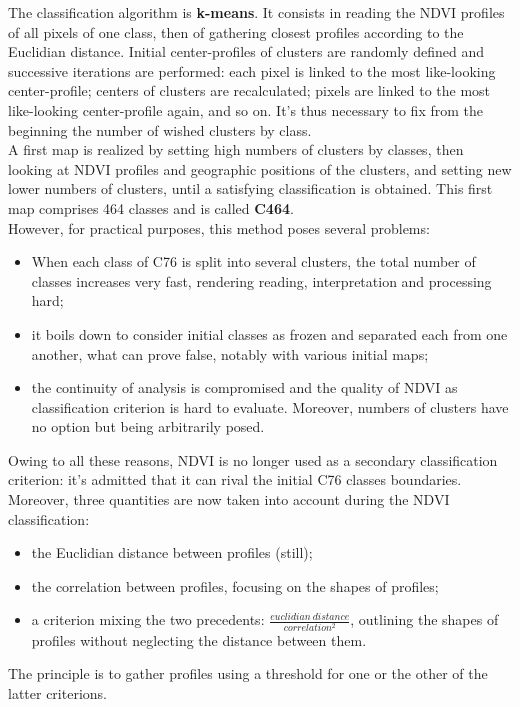 The classification algorithm is \textbf{k-means}. 
It consists in reading the NDVI profiles of all pixels of one class, then of gathering closest profiles 
according to the Euclidian distance. Initial center-profiles of clusters are randomly defined and successive iterations are 
performed: each pixel is linked to the most like-looking center-profile; centers of clusters are recalculated; pixels are linked to 
the most like-looking center-profile again, and so on. It's thus necessary to fix from the beginning the number of wished clusters by class.\\ 
A first map is realized by setting high numbers of clusters by classes, then looking at NDVI profiles and geographic positions of the clusters, and 
setting new lower numbers of clusters, until a satisfying classification is obtained. This first map comprises 464 classes and is called \textbf{C464}. \\ 
However, for practical purposes, this method poses several problems: 
\begin{itemize}
\item{When each class of C76 is split into several clusters, the total number of classes increases very fast, rendering 
reading, interpretation and processing hard; }
\item{it boils down to consider initial classes as frozen and separated each from one another, what can prove false, notably with various 
initial maps;}
\item{the continuity of analysis is compromised and the quality of NDVI as classification criterion is hard to evaluate. Moreover, 
numbers of clusters have no option but being arbitrarily posed. }
\end{itemize}
Owing to all these reasons, NDVI is no longer used as a secondary classification criterion: it's admitted that it can rival the initial 
C76 classes boundaries. Moreover, three quantities are now taken into account during the NDVI classification:
\begin{itemize}
\item{the Euclidian distance between profiles (still);}
\item{the correlation between profiles, focusing on the shapes of profiles;}
\item{a criterion mixing the two precedents: $\frac{euclidian~distance}{correlation^{2}}$, outlining the shapes of profiles without neglecting 
the distance between them.}
\end{itemize}
The principle is to gather profiles using a threshold for one or the other of the latter criterions.
